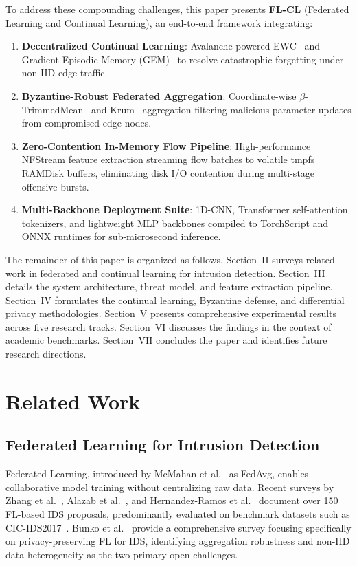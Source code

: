 \documentclass[journal,10pt,twocolumn]{IEEEtran}
\begin{document}
To address these compounding challenges, this paper presents \textbf{FL-CL} (Federated Learning and Continual Learning), an end-to-end framework integrating:
\begin{enumerate}
    \item \textbf{Decentralized Continual Learning}: Avalanche-powered EWC~\cite{carta2023avalanche} and Gradient Episodic Memory (GEM)~\cite{lopez2017gradient} to resolve catastrophic forgetting under non-IID edge traffic.
    \item \textbf{Byzantine-Robust Federated Aggregation}: Coordinate-wise $\beta$-TrimmedMean~\cite{yin2018byzantine} and Krum~\cite{blanchard2017machine} aggregation filtering malicious parameter updates from compromised edge nodes.
    \item \textbf{Zero-Contention In-Memory Flow Pipeline}: High-performance NFStream feature extraction streaming flow batches to volatile tmpfs RAMDisk buffers, eliminating disk I/O contention during multi-stage offensive bursts.
    \item \textbf{Multi-Backbone Deployment Suite}: 1D-CNN, Transformer self-attention tokenizers, and lightweight MLP backbones compiled to TorchScript and ONNX runtimes for sub-microsecond inference.
\end{enumerate}

The remainder of this paper is organized as follows. Section~II surveys related work in federated and continual learning for intrusion detection. Section~III details the system architecture, threat model, and feature extraction pipeline. Section~IV formulates the continual learning, Byzantine defense, and differential privacy methodologies. Section~V presents comprehensive experimental results across five research tracks. Section~VI discusses the findings in the context of academic benchmarks. Section~VII concludes the paper and identifies future research directions.

\section{Related Work}

\subsection{Federated Learning for Intrusion Detection}
Federated Learning, introduced by McMahan et al.~\cite{mcmahan2017communication} as FedAvg, enables collaborative model training without centralizing raw data. Recent surveys by Zhang et al.~\cite{zhang2025survey}, Alazab et al.~\cite{alazab2024survey}, and Hernandez-Ramos et al.~\cite{hernandez2025intrusion} document over 150 FL-based IDS proposals, predominantly evaluated on benchmark datasets such as CIC-IDS2017~\cite{sharafaldin2018toward}. Bunko et al.~\cite{bunko2026survey} provide a comprehensive survey focusing specifically on privacy-preserving FL for IDS, identifying aggregation robustness and non-IID data heterogeneity as the two primary open challenges.
\end{document}
